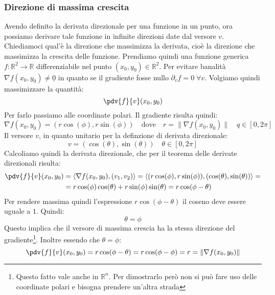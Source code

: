 \subsubsection{Direzione di massima crescita}
Avendo definito la derivata direzionale per una funzione in un punto, ora possiamo derivare tale funzione in infinite direzioni date dal versore $v$. Chiediamoci qual'è la direzione che massimizza la derivata, cioè la direzione che massimizza la crescita delle funzione. Prendiamo quindi una funzione generica $f: \mathbb{R}^2 \to \mathbb{R}$ differenziabile nel punto $(x_0, y_0) \in \mathbb{R}^2$. Per evitare banalità $\nabla f(x_0, y_0) \neq \underline{0}$ in quanto se il gradiente fosse nullo $\partial_v f = 0 \; \forall v$. Volgiamo quindi massimizzare la quantità:
\begin{equation*}
	\pdv{f}{v}(x_0, y_0)
\end{equation*}
Per farlo passiamo alle coordinate polari. Il gradiente risulta quindi:
\begin{equation*}
	\nabla f(x_0, y_0) = (r\cos(\phi), r\sin(\phi)) \quad \text{dove} \quad r = \lVert \nabla f(x_0, y_0) \rVert \quad q \in [0, 2\pi]
\end{equation*}
Il versore $v$, in quanto unitario per la definzione di derivata direzionale:
\begin{equation*}
	v = (\cos(\theta), \sin(\theta)) \quad \theta \in [0, 2\pi]
\end{equation*}
Calcoliamo quindi la derivata direzionale, che per il teorema delle derivate direzionali risulta:
\begin{align*}
	\pdv{f}{v}(x_0, y_0) &= \langle \nabla f(x_0, y_0), (v_1, v_2) \rangle = \langle (r\cos(\phi), r\sin(\phi)), (\cos(\theta), \sin(\theta)) \rangle =\\
	&= r\cos(\phi)\cos(\theta) + r\sin(\phi)\sin(\theta) = r \cos(\phi - \theta)
\end{align*}
Per rendere massima quindi l'espressione $r \cos(\phi - \theta)$ il coseno deve essere uguale a $1$. Quindi:
\begin{equation*}
	\theta = \phi
\end{equation*}
Questo implica che il versore di massima crescia ha la stessa direzione del gradiente\footnote{Questo fatto vale anche in $\mathbb{R}^n$. Per dimostrarlo però non si può fare uso delle coordinate polari e bisogna prendere un'altra strada}. Inoltre essendo che $\theta = \phi$:
\begin{equation*}
	\pdv{f}{v}(x_0, y_0) = r\cos(\phi - \theta) = r\cos(\phi - \phi) = r = \lVert \nabla f(x_0, y_0) \rVert
\end{equation*}
